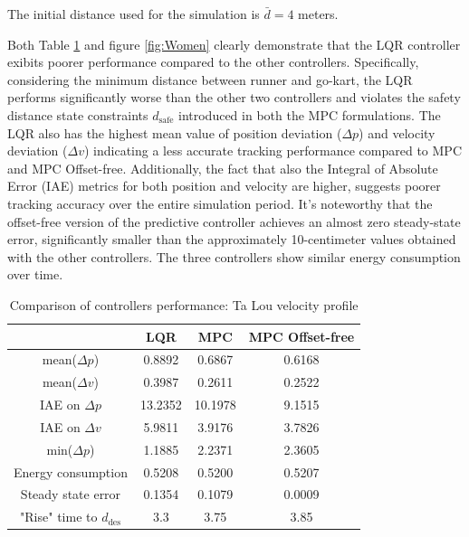 \documentclass[a4paper,12pt,oneside]{book}
\begin{document}
The initial distance used for the simulation is $\bar{d} = 4$ meters.

\bigskip
Both Table \ref{tab:Ta_Lou} and figure \ref{fig:Women} clearly demonstrate that the LQR controller exibits poorer performance compared to the other controllers.
Specifically, considering the minimum distance between runner and go-kart, the LQR performs significantly worse than the other two controllers and violates the safety distance state constraints $d_{\text{safe}}$ introduced in both the MPC formulations.
The LQR also has the highest mean value of position deviation ($\Delta p$) and velocity deviation ($\Delta v$) indicating a less accurate tracking performance compared to MPC and MPC Offset-free.
Additionally, the fact that also the Integral of Absolute Error (IAE) metrics for both position and velocity are higher, suggests poorer tracking accuracy over the entire simulation period.
It's noteworthy that the offset-free version of the predictive controller achieves an almost zero steady-state error, significantly smaller than the approximately 10-centimeter values obtained with the other controllers. 
The three controllers show similar energy consumption over time.

\begin{table}[htbp]
	\centering
	\begin{tabular}{c|c|c|c}
          & \textbf{LQR} & \textbf{MPC} & \textbf{MPC Offset-free} \\
	\hline
	\hline
	mean($\Delta p$) & 0.8892 & 0.6867 &  0.6168 \\
	mean($\Delta v$) & 0.3987 & 0.2611 & 0.2522 \\
	IAE on $\Delta p$ & 13.2352 & 10.1978 & 9.1515 \\
	IAE on $\Delta v$ & 5.9811 & 3.9176 & 3.7826 \\
	min($\Delta p$) & 1.1885 & 2.2371 & 2.3605 \\
	Energy consumption & 0.5208 & 0.5200 & 0.5207 \\
	Steady state error & 0.1354 & 0.1079 & 0.0009 \\
	"Rise" time to $d_\text{des}$ & 3.3 & 3.75 & 3.85 \\
	\hline
	\end{tabular}
\caption{Comparison of controllers performance: Ta Lou velocity profile }
\label{tab:Ta_Lou}
\end{table}
\end{document}
